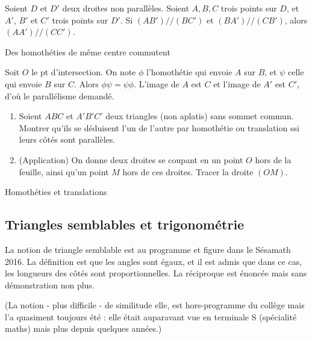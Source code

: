 \begin{exo}
Soient $D$ et $D'$ deux droites non parallèles. Soient $A, B, C$ trois points sur $D$, et $A'$, $B'$ et $C'$ trois points sur $D'$. Si $(AB') // (BC')$ et $(BA') // (CB')$, alors $(AA') // (CC')$.
\begin{hint}    Des homothéties de même centre commutent
\end{hint}
\begin{sol}     
Soit $O$ le pt d'intersection. On note $\phi$ l'homothétie qui envoie $A$ sur $B$, et $\psi$ celle qui envoie $B$ sur $C$. Alors $\phi\psi = \psi\phi$. L'image de $A$ est $C$ et l'image de $A'$ est $C'$, d'où le  parallélisme demandé.
\end{sol}
\end{exo}  


\begin{exo}
\begin{enumerate}
\item Soient $ABC$ et $A'B'C'$ deux triangles (non aplatis) sans sommet commun. Montrer qu'ils se déduisent l'un de l'autre par homothétie ou translation ssi leurs côtés sont parallèles.
\item (Application) On donne deux droites se coupant en un point $O$ hors de la feuille, ainsi qu'un point $M$ hors de ces droites. Tracer la droite $(OM)$.
\end{enumerate}
\begin{hint}   
Homothéties et translations
\end{hint}
\end{exo}  








\subsection{Triangles semblables et trigonométrie}

La notion de triangle semblable est au programme et figure dans le Sésamath 2016. La définition est que les angles sont égaux, et il est admis que dans ce cas, les longueurs des côtés sont proportionnelles. La réciproque est énoncée mais sans démonstration non plus. 

(La notion - plus difficile - de similitude elle, est hors-programme du collège mais l'a quasiment toujours été : elle était auparavant vue en terminale S (spécialité maths) mais plus depuis quelques années.)





